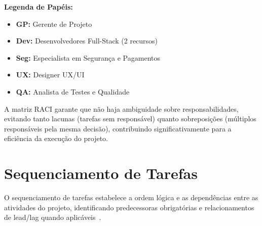 \textbf{Legenda de Papéis:}
\begin{itemize}
    \item \textbf{GP:} Gerente de Projeto
    \item \textbf{Dev:} Desenvolvedores Full-Stack (2 recursos)
    \item \textbf{Seg:} Especialista em Segurança e Pagamentos
    \item \textbf{UX:} Designer UX/UI
    \item \textbf{QA:} Analista de Testes e Qualidade
\end{itemize}

A matriz RACI garante que não haja ambiguidade sobre responsabilidades, evitando tanto lacunas (tarefas sem responsável) quanto sobreposições (múltiplos responsáveis pela mesma decisão), contribuindo significativamente para a eficiência da execução do projeto.

\section{Sequenciamento de Tarefas}

O sequenciamento de tarefas estabelece a ordem lógica e as dependências entre as atividades do projeto, identificando predecessoras obrigatórias e relacionamentos de lead/lag quando aplicáveis~\cite{Kerzner:2022}.

